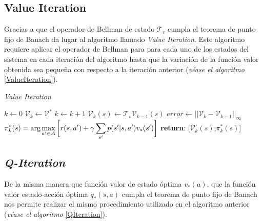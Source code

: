 \subsection*{Value Iteration}
Gracias a que el operador de Bellman de estado $\mathcal{T}_v$ cumpla el teorema de punto fijo de Banach da lugar al algoritmo llamado \emph{Value Iteration}\cite[cap. 4.4]{sutton2018reinforcement}. Este algoritmo requiere aplicar el operador de Bellman para para cada uno de los estados del sistema en cada iteración del algoritmo hasta que la variación de la función valor obtenida sea pequeña con respecto a la iteración anterior (\textit{véase el algoritmo }\ref{ValueIteration}). 


\begin{algorithm}[!ht]
    \caption{\emph{Value Iteration}}\label{ValueIteration}
    \begin{algorithmic}[1]
        \State $k \gets 0$
        \State $\mathcal{V}_k\gets \mathcal{V}^*$
            \State $k \gets k + 1$
                \State $\mathcal{V}_k(s)\gets \mathcal{T}_v\mathcal{V}_{k-1}(s)$
            \EndFor
            \State $error \gets || \mathcal{V}_k - \mathcal{V}_{k-1}||_\infty$
        \EndWhile
        \State $\displaystyle \pi_k^*(s) = \arg \max_{a'\in \mathcal{A}} \bigg[ r(s,a') + \gamma \sum_{s'}p(s'|s,a') v_*(s')
        \bigg]$
        \State \textbf{return}: [$\mathcal{V}_k(s)$,$\pi_k^*(s)$]
        \EndProcedure
    \end{algorithmic}
\end{algorithm}



\subsection*{\emph{Q-Iteration}}

De la misma manera que función valor de estado óptima $v_*(a)$, que la función valor estado-acción óptima $q_*(s,a)$ cumpla el teorema de punto fijo de Banach nos permite realizar el mismo procedimiento utilizado en el algoritmo anterior (\emph{véase el algoritmo }\ref{QIteration}). 



